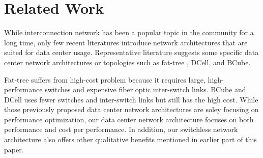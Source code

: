 \vspace{-0.1in}
\section{Related Work}
\label{sec:related}

While interconnection network has been a popular topic in the community for a long time\cite{datacenter3}, only few recent literatures introduce network architectures that are suited for data center usage. Representative literature suggests some specific data center network architectures or topologies such as fat-tree \cite{Al-Fares:2008:SCD, datacenter4}, DCell\cite{datacenter2}, and BCube\cite{datacenter5}. 

Fat-tree suffers from high-cost problem because it requires large, high-performance switches and expensive fiber optic inter-switch links. BCube and DCell uses fewer switches and inter-switch links but still has the high cost. While those previously proposed data center network architectures are soley focusing on performance optimization, our data center network architecture focuses on both performance and cost per performance. In addition, our switchless network architecture also offers other qualitative benefits mentioned in earlier part of this paper.